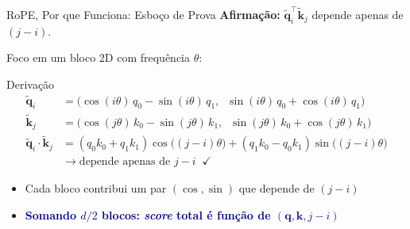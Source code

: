 \documentclass[aspectratio=169, xcolor=dvipsnames]{beamer}
\begin{document}
  \begin{frame}{RoPE, Por que Funciona: Esboço de Prova}
    \textbf{Afirmação:} $\tilde{\mathbf{q}}_i^\top \tilde{\mathbf{k}}_j$ depende apenas de $(j - i)$.

    \vspace{0.3em}
    Foco em um bloco 2D com frequência $\theta$:

    \begin{block}{Derivação}
      \vspace{-0.5em}
      \begin{align*}
        \tilde{\mathbf{q}}_i &= \bigl(\cos(i\theta)\,q_0 - \sin(i\theta)\,q_1,\;\; \sin(i\theta)\,q_0 + \cos(i\theta)\,q_1\bigr)\\[2pt]
        \tilde{\mathbf{k}}_j &= \bigl(\cos(j\theta)\,k_0 - \sin(j\theta)\,k_1,\;\; \sin(j\theta)\,k_0 + \cos(j\theta)\,k_1\bigr)\\[6pt]
        \tilde{\mathbf{q}}_i \cdot \tilde{\mathbf{k}}_j &= (q_0 k_0 + q_1 k_1)\cos\!\bigl((j{-}i)\theta\bigr) + (q_1 k_0 - q_0 k_1)\sin\!\bigl((j{-}i)\theta\bigr) \\[2pt]
        &\to \text{depende apenas de } j - i \;\; \checkmark
      \end{align*}
    \end{block}

    \begin{itemize}
      \item Cada bloco contribui um par $(\cos, \sin)$ que depende de $(j-i)$
      \item \textcolor{DarkBlue}{\textbf{Somando $d/2$ blocos: \textit{score} total é função de $(\mathbf{q}, \mathbf{k}, j{-}i)$}}
    \end{itemize}
  \end{frame}
\end{document}
